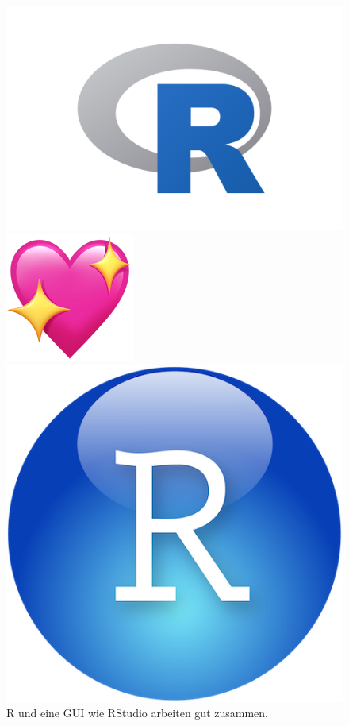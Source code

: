 \documentclass[
  letterpaper,
]{scrbook}
\theoremstyle{definition}
\theoremstyle{definition}
\theoremstyle{definition}
\theoremstyle{remark}
\begin{document}
\begin{figure}

\begin{minipage}{0.40\linewidth}

\includegraphics[width=0.7\linewidth,height=\textheight,keepaspectratio]{img/rlogo.png}

\end{minipage}%
%
\begin{minipage}{0.20\linewidth}

\includegraphics[width=0.4\linewidth,height=\textheight,keepaspectratio]{img/sparkling_heart.png}

\end{minipage}%
%
\begin{minipage}{0.40\linewidth}

\includegraphics[width=0.4\linewidth,height=\textheight,keepaspectratio]{img/rstudio-logo-small.png}

\end{minipage}%

\caption{\label{fig-rlove}R und eine GUI wie RStudio arbeiten gut
zusammen.}

\end{figure}%
\end{document}
